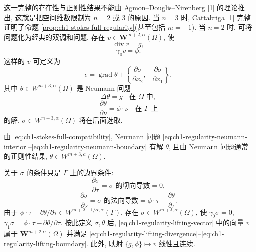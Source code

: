 \begin{Proof}
这一完整的存在性与正则性结果不能由 Agmon--Douglis--Nirenberg [1] 的理论推出, 这就是把空间维数限制为 $n=2$ 或 $3$ 的原因. 当 $n=3$ 时, Cattabriga [1] 完整证明了命题 \ref{prop:ch1-stokes-full-regularity}(甚至包括 $m=-1$). 当 $n=2$ 时, 可将问题化为经典的双调和问题. 存在 $v\in\mathbf W^{m+2,\alpha}(\Omega)$, 使
\begin{equation}
\operatorname{div}v=g,
\label{eq:ch1-regularity-lifting-divergence}
\end{equation}
\begin{equation}
\gamma_0v=\phi.
\label{eq:ch1-regularity-lifting-boundary}
\end{equation}
这样的 $v$ 可定义为
\begin{equation}
v=\operatorname{grad}\theta
+\left\{\frac{\partial\sigma}{\partial x_2},
-\frac{\partial\sigma}{\partial x_1}\right\},
\label{eq:ch1-regularity-lifting-vector}
\end{equation}
其中 $\theta\in W^{m+3,\alpha}(\Omega)$ 是 Neumann 问题
\begin{equation}
\Delta\theta=g\quad\text{在 }\Omega\text{ 中},
\label{eq:ch1-regularity-neumann-interior}
\end{equation}
\begin{equation}
\frac{\partial\theta}{\partial\nu}=\phi\cdot\nu
\quad\text{在 }\Gamma\text{ 上}
\label{eq:ch1-regularity-neumann-boundary}
\end{equation}
的解, $\sigma\in W^{m+3,\alpha}(\Omega)$ 将在后面选取.

由 \eqref{eq:ch1-stokes-full-compatibility}, Neumann 问题 \eqref{eq:ch1-regularity-neumann-interior}--\eqref{eq:ch1-regularity-neumann-boundary} 有解 $\theta$, 且由 Neumann 问题通常的正则性结果, $\theta\in W^{m+3,\alpha}(\Omega)$.

关于 $\sigma$ 的条件只是 $\Gamma$ 上的边界条件:
\[
\frac{\partial\sigma}{\partial\tau}=\sigma\text{ 的切向导数}=0,
\]
\[
\frac{\partial\sigma}{\partial\nu}=\sigma\text{ 的法向导数}
=\phi\cdot\tau-\frac{\partial\theta}{\partial\tau}.
\]
由于 $\phi\cdot\tau-\partial\theta/\partial\tau
\in W^{m+2-1/\alpha,\alpha}(\Gamma)$, 存在 $\sigma\in W^{m+3,\alpha}(\Omega)$, 使 $\gamma_0\sigma=0$, $\gamma_1\sigma=\phi\cdot\tau-\partial\theta/\partial\tau$. 按此定义 $\sigma,\theta$ 后, \eqref{eq:ch1-regularity-lifting-vector} 中的向量 $v$ 属于 $\mathbf W^{m+2,\alpha}(\Omega)$ 并满足 \eqref{eq:ch1-regularity-lifting-divergence}--\eqref{eq:ch1-regularity-lifting-boundary}. 此外, 映射 $\{g,\phi\}\mapsto v$ 线性且连续.


\end{Proof}
